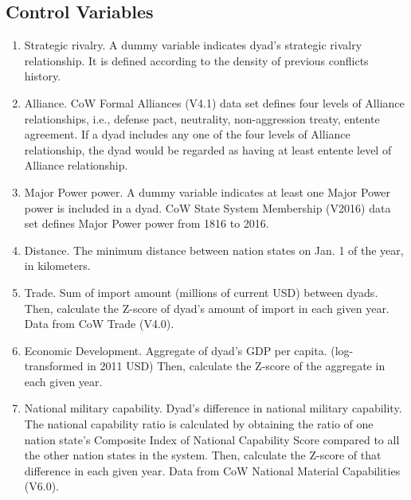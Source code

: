 \documentclass[12pt,a4paper]{article}
\begin{document}
\subsection{Control Variables}
\begin{enumerate}
    \item Strategic rivalry. A dummy variable indicates dyad's strategic rivalry relationship. It is defined according to the density of previous conflicts history. \parencite{thompson_2012_handbook}
    \item Alliance. CoW Formal Alliances (V4.1) data set defines four levels of Alliance relationships, i.e., defense pact, neutrality, non-aggression treaty, entente agreement. \parencite{gibler_2009_international} If a dyad includes any one of the four levels of Alliance relationship, the dyad would be regarded as having at least entente level of Alliance relationship.
    \item Major Power power. A dummy variable indicates at least one Major Power power is included in a dyad. CoW State System Membership (V2016) data set defines Major Power power from 1816 to 2016.
    \item Distance. The minimum distance between nation states on Jan. 1 of the year, in kilometers. \parencite{schvitz_2021_mapping}
    \item Trade. Sum of import amount (millions of current USD) between dyads. Then, calculate the Z-score of dyad's amount of import in each given year. Data from CoW Trade (V4.0). \parencite{barbieri_2009_trading}
    \item Economic Development. Aggregate of dyad's GDP per capita. (log-transformed in 2011 USD) Then, calculate the Z-score of the aggregate in each given year. \parencite{anders_2020_bread}
    \item National military capability. Dyad's difference in national military capability. The national capability ratio is calculated by obtaining the ratio of one nation state's Composite Index of National Capability Score compared to all the other nation states in the system. \parencite{singer_1988_reconstructing} Then, calculate the Z-score of that difference in each given year. Data from CoW National Material Capabilities (V6.0).
\end{enumerate}
\end{document}
